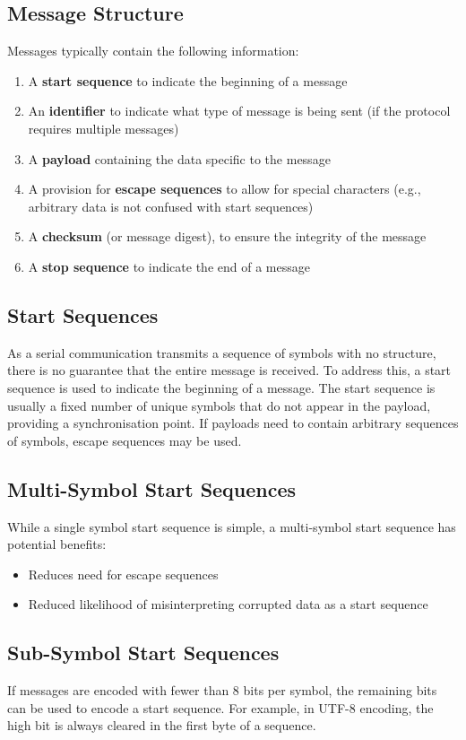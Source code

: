 \documentclass{report}
\begin{document}
\subsection{Message Structure}
Messages typically contain the following information:
\begin{enumerate}
    \item A \textbf{start sequence} to indicate the beginning of a message
    \item An \textbf{identifier} to indicate what type of message is being sent (if the protocol requires multiple messages)
    \item A \textbf{payload} containing the data specific to the message
    \item A provision for \textbf{escape sequences} to allow for special characters (e.g., arbitrary data is not confused with start sequences)
    \item A \textbf{checksum} (or message digest), to ensure the integrity of the message
    \item A \textbf{stop sequence} to indicate the end of a message
\end{enumerate}
\subsection{Start Sequences}
As a serial communication transmits a sequence of symbols with no structure,
there is no guarantee that the entire message is received.
To address this, a start sequence is used to indicate
the beginning of a message. The start sequence is usually a fixed number of unique symbols
that do not appear in the payload, providing a synchronisation point. If payloads need to contain
arbitrary sequences of symbols, escape sequences may be used.
\subsection{Multi-Symbol Start Sequences}
While a single symbol start sequence is simple, a multi-symbol start sequence has potential benefits:
\begin{itemize}
    \item Reduces need for escape sequences
    \item Reduced likelihood of misinterpreting corrupted data as a start sequence
\end{itemize}
\subsection{Sub-Symbol Start Sequences}
If messages are encoded with fewer than 8 bits per symbol, the remaining bits can be used to encode
a start sequence. For example, in UTF-8 encoding, the high bit is always cleared in the first byte of a
sequence.
\end{document}
